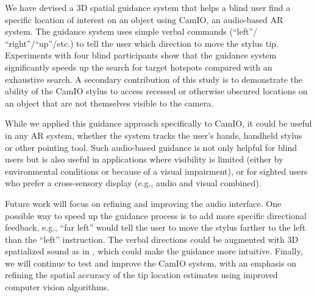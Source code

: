 \documentclass[runningheads]{res/templates/llncs}
\begin{document}
We have devised a 3D spatial guidance system that helps a blind user
find a specific location of interest on an object using CamIO, an
audio-based AR system. The guidance system uses simple verbal commands
(``left''/ ``right''/``up''/etc.) to tell the user which direction to
move the stylus tip. Experiments with four blind participants show that
the guidance system significantly speeds up the search for target
hotspots compared with an exhaustive search. A secondary contribution of
this study is to demonstrate the ability of the CamIO stylus to access
recessed or otherwise obscured locations on an object that are not
themselves visible to the camera.

While we applied this guidance approach specifically to CamIO, it could
be useful in any AR system, whether the system tracks the user's hands,
handheld stylus or other pointing tool. Such audio-based guidance is not
only helpful for blind users but is also useful in applications where
visibility is limited (either by environmental conditions or because of
a visual impairment), or for sighted users who prefer a cross-sensory
display (e.g., audio and visual combined).

Future work will focus on refining and improving the audio interface.
One possible way to speed up the guidance process is to add more
specific directional feedback, e.g., ``far left'' would tell the user to
move the stylus farther to the left than the ``left'' instruction. The
verbal directions could be augmented with 3D spatialized sound as in
\cite{mayAuditoryDisplaysFacilitate2019}, which could make the guidance
more intuitive. Finally, we will continue to test and improve the CamIO
system, with an emphasis on refining the spatial accuracy of the tip
location estimates using improved computer vision algorithms.



\end{document}
